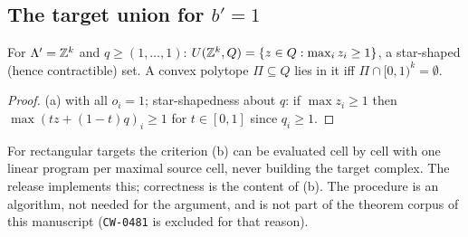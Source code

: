 \subsection{The target union for \texorpdfstring{$b'=1$}{b}}
\begin{corollary}[$U(\Z^k,Q)$]\label{cor:E27}
For $\Lambda'=\mathbb Z^k$ and $q\ge(1,\dots,1)$: $U(\mathbb Z^k,Q)=\{z\in Q:\max_iz_i\ge1\}$, a star-shaped (hence contractible) set. A convex polytope $\Pi\subseteq Q$ lies in it iff $\Pi\cap[0,1)^k=\emptyset$.
\end{corollary}
\begin{proof}
(a) with all $o_i=1$; star-shapedness about $q$: if $\max z_i\ge1$ then $\max(tz+(1-t)q)_i\ge1$ for $t\in[0,1]$ since $q_i\ge1$. \qedhere
\end{proof}
\begin{remark}[predictor]
For rectangular targets the criterion (b) can be evaluated cell by cell with one linear program per maximal source cell, never building the target complex. The release implements this; correctness is the content of (b). The procedure is an algorithm, not needed for the argument, and is not part of the theorem corpus of this manuscript (\texttt{CW-0481} is excluded for that reason).
\end{remark}
